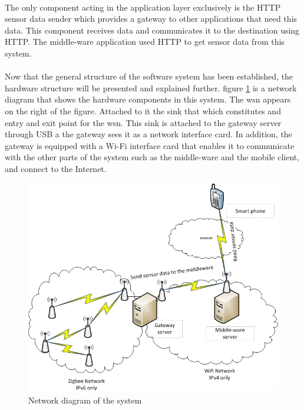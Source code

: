 \documentclass[oneside,12pt,a4paper,final]{book}
\begin{document}
\paragraph{}
The only component acting in the application layer exclusively is the HTTP sensor data sender which provides a gateway to other applications that need this data. This component receives data and communicates it to the destination using HTTP. The middle-ware application used HTTP to get sensor data from this system.
\paragraph{}
Now that the general structure of the software system has been established, the hardware structure will be presented and explained further. figure \ref{fig:network_diagram} is a network diagram that shows the hardware components in this system. The \gls{wsn} appears on the right of the figure. Attached to it the sink that which constitutes and entry and exit point for the \gls{wsn}. This sink is attached to the gateway server through USB a the gateway sees it as a network interface card. In addition, the gateway is equipped with a Wi-Fi interface card that enables it to communicate with the other parts of the system such as the middle-ware and the mobile client, and connect to the Internet.

\begin{figure}[htbp]
\centering
\includegraphics[scale=0.8]{img/network_diagram.jpg}
\caption{Network diagram of the system}
\label{fig:network_diagram}
\end{figure}
\end{document}

